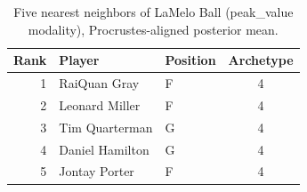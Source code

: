 \begin{table}[htbp]
  \centering\small
  \begin{tabular}{rllc}
    \toprule
    Rank & Player & Position & Archetype \\
    \midrule
    1 & RaiQuan Gray & F & 4 \\
    2 & Leonard Miller & F & 4 \\
    3 & Tim Quarterman & G & 4 \\
    4 & Daniel Hamilton & G & 4 \\
    5 & Jontay Porter & F & 4 \\
    \bottomrule
  \end{tabular}
  \caption{Five nearest neighbors of LaMelo Ball (peak_value modality), Procrustes-aligned posterior mean.}
  \label{tab:LaMelo_Ball_neighbors_peak_value}
\end{table}

